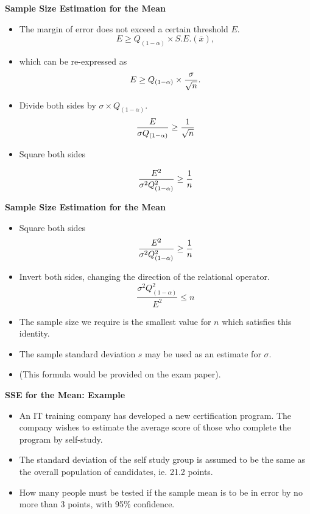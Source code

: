 
\textbf{Sample Size Estimation for the Mean}

\begin{itemize}

\item  The margin of error does not exceed a certain threshold $E$.
\[ E \geq Q_{(1-\alpha)} \times S.E.(\bar{x}), \]

\item  which can be re-expressed as
\[E \geq Q_{(1-\alpha)} \times {\sigma \over \sqrt{n} }.\]

\item  Divide both sides by $\sigma \times Q_{(1-\alpha)}$.
\[ \frac{E}{\sigma Q_{(1-\alpha)}} \geq {1 \over \sqrt{n} } \]

\item  Square both sides

\[ \frac{E^2}{\sigma^2 Q_{(1-\alpha)}^2} \geq {1 \over n } \]

\end{itemize}


\textbf{Sample Size Estimation for the Mean}
\begin{itemize}
\item  Square both sides
\[ \frac{E^2}{\sigma^2 Q^2_{(1-\alpha)}} \geq {1 \over n } \]
\item  Invert both sides, changing the direction of the relational operator.
\[ \frac{\sigma^2 Q^2_{(1-\alpha)}}{E^2} \leq n \]

\item  The sample size we require is the smallest value for $n$ which satisfies this identity.
\item  The sample standard deviation $s$ may be used as an estimate for $\sigma$.
\item  (This formula would be provided on the exam paper).
\end{itemize}



\textbf{SSE for the Mean: Example}
\begin{itemize}
\item  An IT training company has developed a new certification program. The company wishes to estimate the average score of those who complete the program by self-study.  \item  The standard deviation of the self study group is assumed to be the same as the overall population of candidates, ie. 21.2 points.
\item  How many people must be tested if the sample mean is to be in error by no more than 3 points, with 95\% confidence.
\end{itemize}

